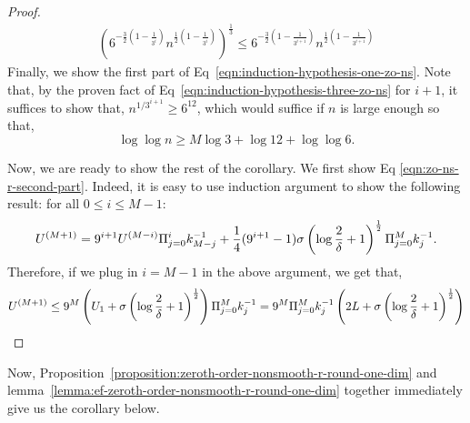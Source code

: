 \begin{proof}
\begin{align*}
	 \left(6^{-\frac{3}{2}\left(1-\frac{1}{3^i}\right)}
			n^{\frac{1}{2}\left(1-\frac{1}{3^i}\right)} \right)^\frac{1}{3}
	\leq 6^{-\frac{3}{2}\left(1-\frac{1}{3^{i+1}}\right)}	
		n^{\frac{1}{2}\left(1-\frac{1}{3^{i+1}}\right)} 
\end{align*}
Finally, we show the first part of Eq~\eqref{eqn:induction-hypothesis-one-zo-ns}. Note 
that, by the proven fact of Eq~\eqref{eqn:induction-hypothesis-three-zo-ns} for $i+1$, 
it suffices to show that, $n^{1/3^{i+1}} \geq 6^{12}$, which would suffice if $n$ is large 
enough so that, 
\begin{equation*}
\log \log n \geq M\log 3 + \log 12 +\log \log 6. 
\end{equation*}

Now, we are ready to show the rest of the corollary. We first show Eq
\eqref{eqn:zo-ns-r-second-part}. Indeed, it is easy to use 
induction argument to show the following result: for all $0\leq i\leq M-1$: 
\begin{equation*}
U^{(M+1)} = 9^{i+1} U^{(M-i)} \Pi_{j=0}^i k_{M-j}^{-1} + \frac{1}{4}(9^{i+1}-1)
	\sigma \left(\log \frac{2}{\delta} + 1\right)^{\frac{1}{2}} \Pi_{j=0}^M k_j^{-1}.
\end{equation*}
Therefore, if we plug in $i = M-1$ in the above argument, we get that, 
\begin{equation*}
U^{(M+1)} \leq 9^{M} \left(U_1 + \sigma \left(\log \frac{2}{\delta} + 1\right)^{\frac{1}{2}} \right)
	 \Pi_{j=0}^M k_j^{-1} = 9^{M}
	 \Pi_{j=0}^M k_j^{-1} \left(2L + \sigma \left(\log \frac{2}{\delta} + 1\right)^{\frac{1}{2}} \right)
\end{equation*}
%
\end{proof}
Now, Proposition~\ref{proposition:zeroth-order-nonsmooth-r-round-one-dim}
and lemma~\ref{lemma:ef-zeroth-order-nonsmooth-r-round-one-dim} together 
immediately give us the corollary below. 

